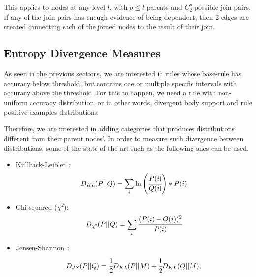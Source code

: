 This applies to nodes at any level $l$, with $p \leq l$ parents and $C_{2}^{p}$ possible join pairs. If any of the
join
pairs has enough evidence of being dependent, then 2 edges are created connecting each of the joined
nodes to the result of their join.

\subsection{Entropy Divergence Measures}

As seen in the previous sections, we are interested in rules whose base-rule has accuracy below threshold, but
contains one or multiple specific intervals with accuracy above the threshold. For this to happen, we need a rule with
non-uniform accuracy distribution, or in other words, divergent body support and rule positive examples distributions.

Therefore, we are interested in adding categories that produces distributions different from their parent nodes'. In
order to measure such divergence between distributions, some of the state-of-the-art such as the following ones can be
used.

\begin{itemize}
 \item Kullback-Leibler~\cite{Kullback51klDivergence}: 
    \begin{equation}
      D_{KL}(P||Q)=\sum_{\substack{i}}\ln\left(\cfrac{P(i)}{Q(i)}\right)*P(i)
    \end{equation}
 \item Chi-squared ($\chi^2$):
    \begin{equation}
      D_{\chi^2}(P||Q)=\sum_{\substack{i}}\cfrac{(P(i)-Q(i))^2}{P(i)}
    \end{equation}
 \item Jensen-Shannon~\cite{17795}:
    \begin{equation}
      D_{JS}(P||Q)=\cfrac{1}{2}D_{KL}(P||M)+\cfrac{1}{2}D_{KL}(Q||M), 
    \end{equation}
\end{itemize}

